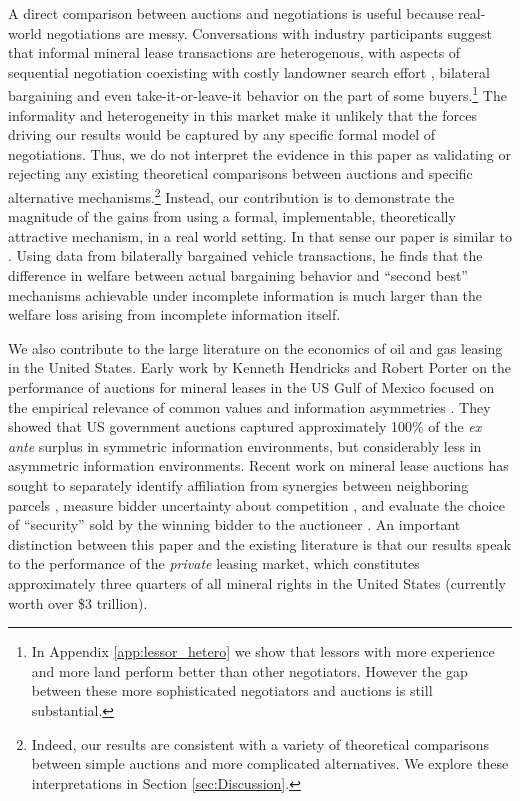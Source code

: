 A direct comparison between auctions and negotiations is useful because real-world negotiations are messy.  Conversations with industry participants suggest that informal mineral lease transactions are heterogenous, with aspects of sequential negotiation coexisting with costly landowner search effort \citep{hortacsu_product_2004,allen_search_2014,cuesta2018price}, bilateral bargaining \citep{backus_cheap_2015, backus2, larsen2021efficiency} and even take-it-or-leave-it behavior on the part of some buyers.\footnote{In Appendix \ref{app:lessor_hetero} we show that lessors with more experience and more land perform better than other negotiators. However the gap between these more sophisticated negotiators and auctions is still substantial.}  The informality and heterogeneity in this market make it unlikely that the forces driving our results would be captured by any specific formal model of negotiations. Thus, we do not interpret the evidence in this paper as validating or rejecting any existing theoretical comparisons between auctions and specific alternative mechanisms.\footnote{Indeed, our results are consistent with a variety of theoretical comparisons between simple auctions and more complicated alternatives.  We explore these interpretations in Section \ref{sec:Discussion}.}  Instead, our contribution is to demonstrate the magnitude of the gains from using a formal, implementable, theoretically attractive mechanism, in a real world setting. In that sense our paper is similar to \cite{larsen2021efficiency}. Using data from bilaterally bargained vehicle transactions, he finds that the difference in welfare between actual bargaining behavior and ``second best'' mechanisms achievable under incomplete information is much larger than the \cite{myerson1983efficient} welfare loss arising from incomplete information itself.
 
We also contribute to the large literature on the economics of oil and gas leasing in the United States.  Early work by Kenneth Hendricks and Robert Porter on the performance of auctions for mineral leases in the US Gulf of Mexico focused on the empirical relevance of common values and information asymmetries \citep{hendricks_timing_1996, hendricks_empirical_1988}. They showed that US government auctions captured approximately 100\% of the \textit{ex ante} surplus in symmetric information environments, but considerably less in asymmetric information environments. Recent work on mineral lease auctions has sought to separately identify affiliation from synergies between neighboring parcels \citep{kong_selective_2017}, measure bidder uncertainty about competition \citep{kong2016sequential}, and evaluate the choice of ``security'' sold by the winning bidder to the auctioneer \citep{bhattacharya2018bidding}. An important distinction between this paper and the existing literature is that our results speak to the performance of the \textit{private} leasing market, which constitutes approximately three quarters of all mineral rights in the United States (currently worth over \$3 trillion).  

